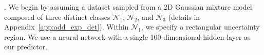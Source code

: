 . We begin by assuming a dataset sampled from a 2D Gaussian mixture model composed of three distinct classes $\mathcal{N}_1$, $\mathcal{N}_2$, and $\mathcal{N}_3$ (details in Appendix~\ref{app:add_exp_det}). 
Within $\mathcal{N}_1$, we specify a rectangular uncertainty region. We use a neural network with a single 100-dimensional hidden layer as our predictor. %


